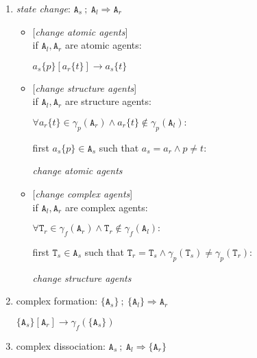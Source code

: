 \documentclass[12pt]{article}
\begin{document}
\begin{enumerate}
\item \textit{state change}: $\mathtt{A}_s~;~\mathtt{A}_l \Rightarrow \mathtt{A}_r$

\begin{itemize}

\item {[}\textit{change atomic agents}{]}\\ if $\mathtt{A}_l, \mathtt{A}_r$ are atomic agents: 

\hspace{1cm} $a_s\{p\}[a_r\{t\}] \rightarrow a_s\{t\}$

\item  {[}\textit{change structure agents}{]}\\ if $\mathtt{A}_l, \mathtt{A}_r$ are structure agents: 

\hspace{1cm} $\forall a_r\{t\} \in \gamma_p(\mathtt{A}_r) \wedge a_r\{t\} \notin \gamma_p(\mathtt{A}_l):$

\hspace{2cm} first $ a_s\{p\} \in \mathtt{A}_s$ such that $ a_s = a_r \wedge p \neq t:$

\hspace{3cm} \textit{change atomic agents}

\item  {[}\textit{change complex agents}{]}\\ if $\mathtt{A}_l, \mathtt{A}_r$ are complex agents: 

\hspace{1cm} $\forall \mathtt{T}_r \in \gamma_f(\mathtt{A}_r) \wedge \mathtt{T}_r \not\in \gamma_f(\mathtt{A}_l): $

\hspace{2cm} first $\mathtt{T}_s \in \mathtt{A}_s$ such that $\mathtt{T}_r = \mathtt{T}_s \wedge \gamma_p(\mathtt{T}_s) \neq \gamma_p(\mathtt{T}_r):$

\hspace{3cm}  \textit{change structure agents}

\end{itemize}

\item complex formation: $\{\mathtt{A}_s\}~;~\{\mathtt{A}_l\} \Rightarrow \mathtt{A}_r$

\hspace{1cm} $\{\mathtt{A}_s\}[\mathtt{A}_r] \rightarrow \gamma_f(\{\mathtt{A}_s\}) $

\item complex dissociation: $\mathtt{A}_s~;~\mathtt{A}_l \Rightarrow \{\mathtt{A}_r\}$


\end{enumerate}
\end{document}
